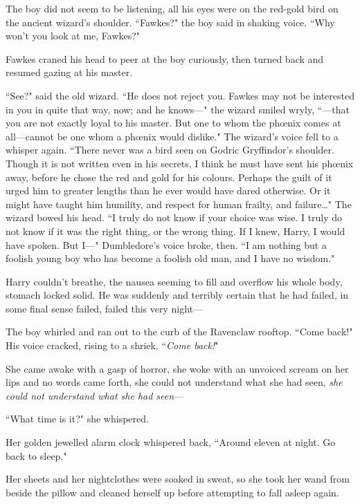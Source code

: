 The boy did not seem to be listening, all his eyes were on the red-gold bird on the ancient wizard's shoulder. ``Fawkes?" the boy said in shaking voice. ``Why won't you look at me, Fawkes?"

Fawkes craned his head to peer at the boy curiously, then turned back and resumed gazing at his master.

``See?" said the old wizard. ``He does not reject you. Fawkes may not be interested in you in quite that way, now; and he knows—" the wizard smiled wryly, ``—that you are not exactly loyal to his master. But one to whom the phœnix comes at all—cannot be one whom a phœnix would dislike." The wizard's voice fell to a whisper again. ``There never was a bird seen on Godric Gryffindor's shoulder. Though it is not written even in his secrets, I think he must have sent his phœnix away, before he chose the red and gold for his colours. Perhaps the guilt of it urged him to greater lengths than he ever would have dared otherwise. Or it might have taught him humility, and respect for human frailty, and failure{\ldots}" The wizard bowed his head. ``I truly do not know if your choice was wise. I truly do not know if it was the right thing, or the wrong thing. If I knew, Harry, I would have spoken. But I—" Dumbledore's voice broke, then. ``I am nothing but a foolish young boy who has become a foolish old man, and I have no wisdom."

Harry couldn't breathe, the nausea seeming to fill and overflow his whole body, stomach locked solid. He was suddenly and terribly certain that he had failed, in some final sense failed, failed this very night—

The boy whirled and ran out to the curb of the Ravenclaw rooftop. ``Come back!" His voice cracked, rising to a shriek. ``\emph{Come back!}"


She came awake with a gasp of horror, she woke with an unvoiced scream on her lips and no words came forth, she could not understand what she had seen, \emph{she could not understand what she had seen}—

``What time is it?" she whispered.

Her golden jewelled alarm clock whispered back, ``Around eleven at night. Go back to sleep."

Her sheets and her nightclothes were soaked in sweat, so she took her wand from beside the pillow and cleaned herself up before attempting to fall asleep again.

